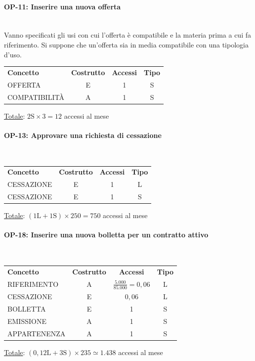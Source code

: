 \documentclass[a4paper,12pt]{report}
\begin{document}
\paragraph{OP-11: Inserire una nuova offerta}\mbox{}\\
    Vanno specificati gli usi con cui l'offerta è compatibile e la materia prima a cui fa riferimento. Si suppone che un'offerta sia in media compatibile con una tipologia d'uso.
    \begin{center}
    \begin{tabular}{@{}l c  c  c@{}}
        \hline
        \textbf{Concetto} & \textbf{Costrutto} & \textbf{Accessi} & \textbf{Tipo} \\ [0.5ex]
        OFFERTA & E & 1 & S \\
        COMPATIBILITÀ & A & 1 & S \\
        \hline
    \end{tabular}
    \end{center}
    \underline{Totale}: $2\text{S} \times 3 = 12$ accessi al mese
\paragraph{OP-13: Approvare una richiesta di cessazione}\mbox{}\\
\begin{center}
\begin{tabular}{@{}l c  c  c@{}}
    \hline
    \textbf{Concetto} & \textbf{Costrutto} & \textbf{Accessi} & \textbf{Tipo} \\ [0.5ex]
    CESSAZIONE & E & 1 & L \\
    CESSAZIONE & E & 1 & S \\
    \hline
\end{tabular}
\end{center}
\underline{Totale}: $(1\text{L} + 1\text{S}) \times 250 = 750$ accessi al mese
\paragraph{OP-18: Inserire una nuova bolletta per un contratto attivo}\mbox{}\\
\begin{center}
\begin{tabular}{@{}l c  c  c@{}}
    \hline
    \textbf{Concetto} & \textbf{Costrutto} & \textbf{Accessi} & \textbf{Tipo} \\ [0.5ex]
    RIFERIMENTO & A & $\frac{5.000}{85.000} = 0,06$ & L \\
    CESSAZIONE & E & $0,06$ & L \\
    BOLLETTA & E & 1 & S \\
    EMISSIONE & A & 1 & S \\
    APPARTENENZA & A & 1 & S \\
    \hline
\end{tabular}
\end{center}
\underline{Totale}: $(0,12\text{L} + 3\text{S}) \times 235 \simeq 1.438$ accessi al mese
\end{document}
